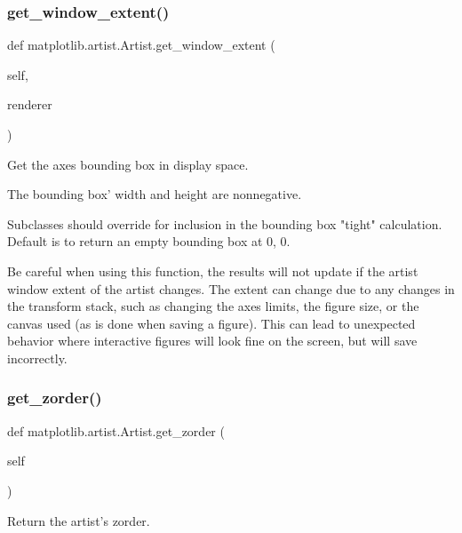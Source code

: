 \subsubsection{\texorpdfstring{get\+\_\+window\+\_\+extent()}{get\_window\_extent()}}
{\footnotesize\ttfamily def matplotlib.\+artist.\+Artist.\+get\+\_\+window\+\_\+extent (\begin{DoxyParamCaption}\item[{}]{self,  }\item[{}]{renderer }\end{DoxyParamCaption})}

\begin{DoxyVerb}Get the axes bounding box in display space.

The bounding box' width and height are nonnegative.

Subclasses should override for inclusion in the bounding box
"tight" calculation. Default is to return an empty bounding
box at 0, 0.

Be careful when using this function, the results will not update
if the artist window extent of the artist changes.  The extent
can change due to any changes in the transform stack, such as
changing the axes limits, the figure size, or the canvas used
(as is done when saving a figure).  This can lead to unexpected
behavior where interactive figures will look fine on the screen,
but will save incorrectly.
\end{DoxyVerb}
 \mbox{\label{classmatplotlib_1_1artist_1_1Artist_ad9c180894edb84c61d901ba395379ebb}} 
\subsubsection{\texorpdfstring{get\+\_\+zorder()}{get\_zorder()}}
{\footnotesize\ttfamily def matplotlib.\+artist.\+Artist.\+get\+\_\+zorder (\begin{DoxyParamCaption}\item[{}]{self }\end{DoxyParamCaption})}

\begin{DoxyVerb}Return the artist's zorder.\end{DoxyVerb}
 \mbox{\label{classmatplotlib_1_1artist_1_1Artist_a90a8117b79947b16d3f5ceb1e1111e93}} 
